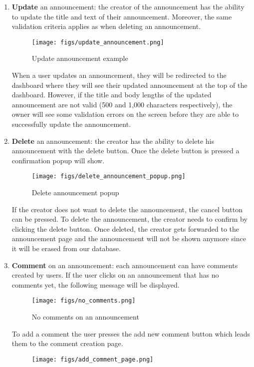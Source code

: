 \documentclass[conference]{IEEEtran}
\begin{document}
\begin{enumerate}
\begin{figure}[H]
    \end{figure}
    \item \textbf{Update} an announcement: the creator of the announcement has the ability to update the title and text of their announcement. Moreover, the same validation criteria applies as when deleting an announcement. 
    \begin{figure}[H]
    \centering
    \texttt{[image: figs/update\_announcement.png]}
    \caption{Update announcement example}
    \label{fig:Update announcement example}
    \end{figure}
    When a user updates an announcement, they will be redirected to the dashboard where they will see their updated announcement at the top of the dashboard. However, if the title and body lengths of the updated announcement are not valid (500 and 1,000 characters respectively), the owner will see some validation errors on the screen before they are able to successfully update the announcement.
    \item \textbf{Delete} an announcement: the creator has the ability to delete his announcement with the delete button. Once the delete button is pressed a confirmation popup will show.
    \begin{figure}[H]
    \centering
    \texttt{[image: figs/delete\_announcement\_popup.png]}
    \caption{Delete announcement popup}
    \label{fig:Delete announcement popup}
    \end{figure}
    If the creator does not want to delete the announcement, the cancel button can be pressed. To delete the announcement, the creator needs to confirm by clicking the delete button. Once deleted, the creator gets forwarded to the announcement page and the announcement will not be shown anymore since it will be erased from our database.
    \item \textbf{Comment} on an announcement: each announcement can have comments created by users. If the user clicks on an announcement that has no comments yet, the following message will be displayed.
    \begin{figure}[H]
    \centering
    \texttt{[image: figs/no\_comments.png]}
    \caption{No comments on an announcement}
    \label{fig:No comments on an announcement}
    \end{figure}
    To add a comment the user presses the add new comment button which leads them to the comment creation page.
    \begin{figure}[H]
    \centering
    \texttt{[image: figs/add\_comment\_page.png]}

\end{figure}
\end{enumerate}
\end{document}
